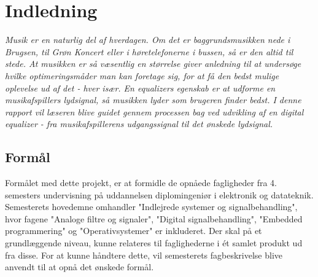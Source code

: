 \chapter{Indledning}
\vspace*{0.5 cm}
\emph{Musik er en naturlig del af hverdagen. Om det er baggrundsmusikken nede i Brugsen, til Grøn Koncert eller i høretelefonerne i bussen, så er den altid til stede. At musikken er så væsentlig en størrelse giver anledning til at undersøge hvilke optimeringsmåder man kan foretage sig, for at få den bedst mulige oplevelse ud af det - hver især. En equalizers egenskab er at udforme en musikafspillers lydsignal, så musikken lyder som brugeren finder bedst. I denne rapport vil læseren blive guidet gennem processen bag ved udvikling af en digital equalizer - fra musikafspillerens udgangssignal til det ønskede lydsignal.}

\section{Formål}
%
%
Formålet med dette projekt, er at formidle de opnåede fagligheder fra 4. semesters undervisning på uddannelsen diplomingeniør i elektronik og datateknik. Semesterets hovedemne omhandler "Indlejrede systemer og signalbehandling", hvor fagene "Analoge filtre og signaler", "Digital signalbehandling", "Embedded programmering" og "Operativsystemer" er inkluderet. Der skal på et grundlæggende niveau, kunne relateres til faglighederne i ét samlet produkt ud fra disse. For at kunne håndtere dette, vil semesterets fagbeskrivelse blive anvendt til at opnå det ønskede formål.


